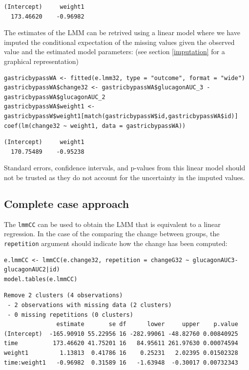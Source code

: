 \documentclass[12pt]{article}
\newcommand\Warning[1][3ex]{%
\renewcommand\stacktype{L}%
\scaleto{\stackon[1.3pt]{\color{red}$\triangle$}{\tiny\bfseries !}}{#1}%
\xspace
}
\begin{document}
\begin{verbatim}
(Intercept)     weight1 
  173.46620    -0.96982
\end{verbatim}


The estimates of the LMM can be retrived using a linear model where we
have imputed the conditional expectation of the missing values given
the observed value and the estimated model parameters: (see section
\ref{imputation} for a graphical representation)
\lstset{language=r,label= ,caption= ,captionpos=b,numbers=none}
\begin{lstlisting}
gastricbypassWA <- fitted(e.lmm32, type = "outcome", format = "wide")
gastricbypassWA$change32 <- gastricbypassWA$glucagonAUC_3 - gastricbypassWA$glucagonAUC_2
gastricbypassWA$weight1 <- gastricbypassW$weight1[match(gastricbypassW$id,gastricbypassWA$id)]
coef(lm(change32 ~ weight1, data = gastricbypassWA))
\end{lstlisting}

\begin{verbatim}
(Intercept)     weight1 
  170.75489    -0.95238
\end{verbatim}



\Warning Standard errors, confidence intervals, and p-values from this
linear model should not be trusted as they do not account for the
uncertainty in the imputed values.

\subsection{Complete case approach}
\label{sec:org3af742a}

The \texttt{lmmCC} can be used to obtain the LMM that is equivalent to a
linear regression. In the case of the comparing the change between
groups, the \texttt{repetition} argument should indicate how the change has
been computed:
\lstset{language=r,label= ,caption= ,captionpos=b,numbers=none}
\begin{lstlisting}
e.lmmCC <- lmmCC(e.change32, repetition = changeG32 ~ glucagonAUC3-glucagonAUC2|id)
model.tables(e.lmmCC)
\end{lstlisting}

\begin{verbatim}
Remove 2 clusters (4 observations) 
 - 2 observations with missing data (2 clusters) 
 - 0 missing repetitions (0 clusters)
               estimate       se df      lower     upper    p.value
(Intercept)  -165.90910 55.22956 16 -282.99061 -48.82760 0.00840925
time          173.46620 41.75201 16   84.95611 261.97630 0.00074594
weight1         1.13813  0.41786 16    0.25231   2.02395 0.01502328
time:weight1   -0.96982  0.31589 16   -1.63948  -0.30017 0.00732343
\end{verbatim}
\end{document}
